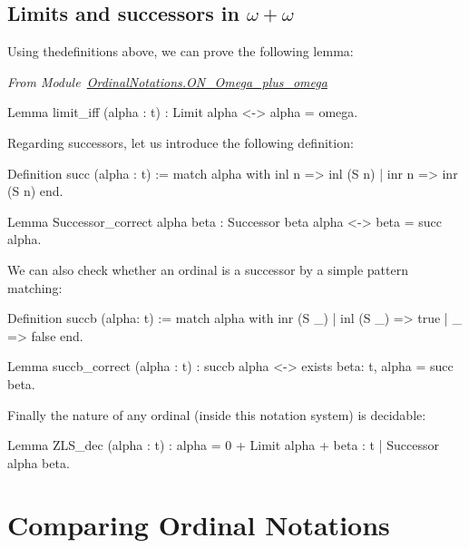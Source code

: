 \subsection{Limits and successors in \texorpdfstring{$\omega+\omega$}{omega+omega}}

Using thedefinitions above, we can prove the following lemma:

\vspace{4pt}

\noindent\emph{From Module~\href{../src/html/hydras.OrdinalNotations.ON_Omega_plus_omega.html}{OrdinalNotations.ON\_Omega\_plus\_omega}}

\begin{Coqsrc}
Lemma limit_iff (alpha : t) : Limit alpha <-> alpha = omega.
\end{Coqsrc}

Regarding successors, let us introduce the following definition:

\begin{Coqsrc}
Definition succ (alpha : t) :=
  match alpha with
    inl n => inl (S n)
  | inr n => inr (S n)
  end.
\end{Coqsrc}


\begin{Coqsrc}
Lemma Successor_correct alpha beta : Successor beta alpha <->
                                     beta = succ alpha.
\end{Coqsrc}

We can also check whether an ordinal is a successor by a simple pattern matching:

\begin{Coqsrc}
Definition succb (alpha: t) := match alpha with
                                   inr (S  _) | inl (S _) => true
                                 | _ => false
                                 end.

Lemma succb_correct (alpha : t) :
    succb alpha <->  exists beta: t,   alpha = succ beta.
\end{Coqsrc}


Finally the nature of any ordinal (inside this notation system) is decidable:

\begin{Coqsrc}
Lemma ZLS_dec (alpha : t) :
  {alpha = 0} +
  {Limit alpha} +
  {beta : t | Successor alpha beta}.
\end{Coqsrc}




\section{Comparing Ordinal Notations}

